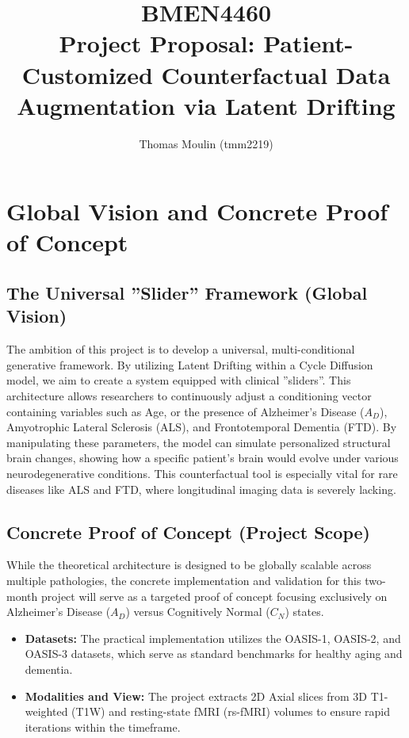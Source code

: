 \documentclass[11pt,a4paper]{article}
\title{\textbf{BMEN4460\\
    Project Proposal: Patient-Customized Counterfactual Data Augmentation via Latent Drifting}}
\author{Thomas Moulin (tmm2219)}
\date{}
\begin{document}
\maketitle

\section{Global Vision and Concrete Proof of Concept}

\subsection{The Universal ''Slider'' Framework (Global Vision)}
The ambition of this project is to develop a universal, multi-conditional generative framework. By utilizing Latent Drifting within a Cycle Diffusion model, we aim to create a system equipped with clinical ''sliders''. This architecture allows researchers to continuously adjust a conditioning vector containing variables such as Age, or the presence of Alzheimer's Disease ($A_D$), Amyotrophic Lateral Sclerosis (ALS), and Frontotemporal Dementia (FTD). By manipulating these parameters, the model can simulate personalized structural brain changes, showing how a specific patient's brain would evolve under various neurodegenerative conditions. This counterfactual tool is especially vital for rare diseases like ALS and FTD, where longitudinal imaging data is severely lacking.

\subsection{Concrete Proof of Concept (Project Scope)}
While the theoretical architecture is designed to be globally scalable across multiple pathologies, the concrete implementation and validation for this two-month project will serve as a targeted proof of concept focusing exclusively on Alzheimer's Disease ($A_D$) versus Cognitively Normal ($C_N$) states.
\begin{itemize}
    \item \textbf{Datasets:} The practical implementation utilizes the OASIS-1, OASIS-2, and OASIS-3 datasets, which serve as standard benchmarks for healthy aging and dementia.
    \item \textbf{Modalities and View:} The project extracts 2D Axial slices from 3D T1-weighted (T1W) and resting-state fMRI (rs-fMRI) volumes to ensure rapid iterations within the timeframe.
\end{itemize}
\end{document}
